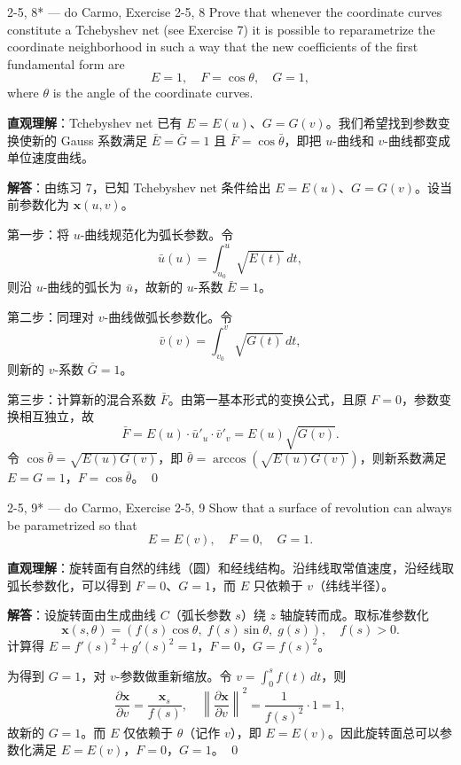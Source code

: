 \begin{exercise}{2-5, 8* — do Carmo, Exercise 2-5, 8}
Prove that whenever the coordinate curves constitute a Tchebyshev net (see Exercise 7) it is possible to reparametrize the coordinate neighborhood in such a way that the new coefficients of the first fundamental form are
\[
E = 1, \quad F = \cos \theta, \quad G = 1,
\]
where $\theta$ is the angle of the coordinate curves.
\end{exercise}

\begin{solution}
\textbf{直观理解}：Tchebyshev net 已有 $E = E(u)$、$G = G(v)$。我们希望找到参数变换使新的 Gauss 系数满足 $\bar{E} = \bar{G} = 1$ 且 $\bar{F} = \cos\bar{\theta}$，即把 $u$-曲线和 $v$-曲线都变成单位速度曲线。

\textbf{解答}：由练习 7，已知 Tchebyshev net 条件给出 $E = E(u)$、$G = G(v)$。设当前参数化为 $\mathbf{x}(u,v)$。

第一步：将 $u$-曲线规范化为弧长参数。令
\[
\bar{u}(u) = \int_{u_0}^u \sqrt{E(t)}\, dt,
\]
则沿 $u$-曲线的弧长为 $\bar{u}$，故新的 $u$-系数 $\bar{E} = 1$。

第二步：同理对 $v$-曲线做弧长参数化。令
\[
\bar{v}(v) = \int_{v_0}^v \sqrt{G(t)}\, dt,
\]
则新的 $v$-系数 $\bar{G} = 1$。

第三步：计算新的混合系数 $\bar{F}$。由第一基本形式的变换公式，且原 $F = 0$，参数变换相互独立，故
\[
\bar{F} = E(u) \cdot \bar{u}'_u \cdot \bar{v}'_v = E(u) \sqrt{G(v)}.
\]
令 $\cos\bar\theta = \sqrt{E(u)G(v)}$，即 $\bar\theta = \arccos(\sqrt{E(u)G(v)})$，则新系数满足 $E = G = 1$，$F = \cos\bar\theta$。
\qed
\end{solution}

\begin{exercise}{2-5, 9* — do Carmo, Exercise 2-5, 9}
Show that a surface of revolution can always be parametrized so that
\[
E = E(v), \quad F = 0, \quad G = 1.
\]
\end{exercise}

\begin{solution}
\textbf{直观理解}：旋转面有自然的纬线（圆）和经线结构。沿纬线取常值速度，沿经线取弧长参数化，可以得到 $F = 0$、$G = 1$，而 $E$ 只依赖于 $v$（纬线半径）。

\textbf{解答}：设旋转面由生成曲线 $C$（弧长参数 $s$）绕 $z$ 轴旋转而成。取标准参数化
\[
\mathbf{x}(s, \theta) = (f(s)\cos\theta,\; f(s)\sin\theta,\; g(s)),\quad f(s) > 0.
\]
计算得 $E = f'(s)^2 + g'(s)^2 = 1$，$F = 0$，$G = f(s)^2$。

为得到 $G = 1$，对 $v$-参数做重新缩放。令 $v = \int_0^s f(t)\, dt$，则
\[
\frac{\partial\mathbf{x}}{\partial v} = \frac{\mathbf{x}_s}{f(s)},\quad
\left\|\frac{\partial\mathbf{x}}{\partial v}\right\|^2 = \frac{1}{f(s)^2}\cdot 1 = 1,
\]
故新的 $G = 1$。而 $E$ 仅依赖于 $\theta$（记作 $v$），即 $E = E(v)$。因此旋转面总可以参数化满足 $E = E(v)$，$F = 0$，$G = 1$。
\qed
\end{solution}

